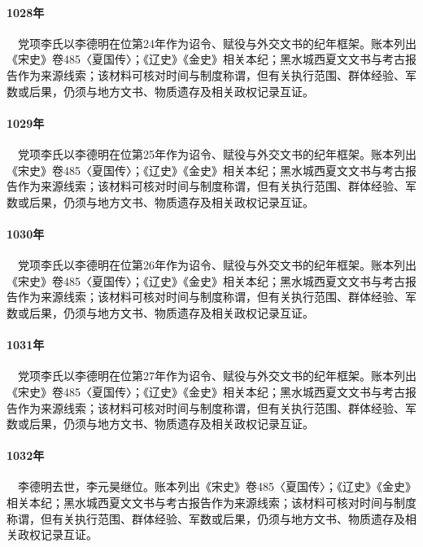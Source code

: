 \paragraph{1028年}　党项李氏以李德明在位第24年作为诏令、赋役与外交文书的纪年框架。账本列出《宋史》卷485〈夏国传〉；《辽史》《金史》相关本纪；黑水城西夏文文书与考古报告作为来源线索；该材料可核对时间与制度称谓，但有关执行范围、群体经验、军数或后果，仍须与地方文书、物质遗存及相关政权记录互证。

\paragraph{1029年}　党项李氏以李德明在位第25年作为诏令、赋役与外交文书的纪年框架。账本列出《宋史》卷485〈夏国传〉；《辽史》《金史》相关本纪；黑水城西夏文文书与考古报告作为来源线索；该材料可核对时间与制度称谓，但有关执行范围、群体经验、军数或后果，仍须与地方文书、物质遗存及相关政权记录互证。

\paragraph{1030年}　党项李氏以李德明在位第26年作为诏令、赋役与外交文书的纪年框架。账本列出《宋史》卷485〈夏国传〉；《辽史》《金史》相关本纪；黑水城西夏文文书与考古报告作为来源线索；该材料可核对时间与制度称谓，但有关执行范围、群体经验、军数或后果，仍须与地方文书、物质遗存及相关政权记录互证。

\paragraph{1031年}　党项李氏以李德明在位第27年作为诏令、赋役与外交文书的纪年框架。账本列出《宋史》卷485〈夏国传〉；《辽史》《金史》相关本纪；黑水城西夏文文书与考古报告作为来源线索；该材料可核对时间与制度称谓，但有关执行范围、群体经验、军数或后果，仍须与地方文书、物质遗存及相关政权记录互证。

\paragraph{1032年}　李德明去世，李元昊继位。账本列出《宋史》卷485〈夏国传〉；《辽史》《金史》相关本纪；黑水城西夏文文书与考古报告作为来源线索；该材料可核对时间与制度称谓，但有关执行范围、群体经验、军数或后果，仍须与地方文书、物质遗存及相关政权记录互证。

